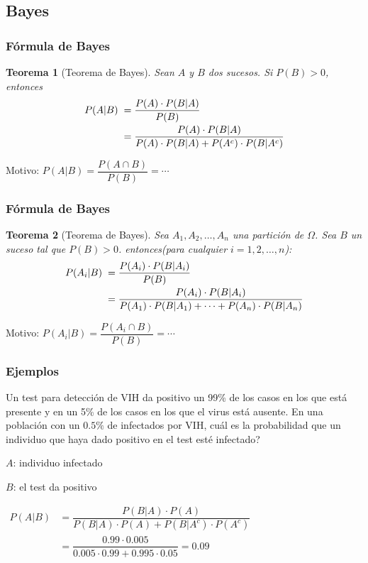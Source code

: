 \documentclass[handout]{beamer}\usepackage[]{graphicx}\usepackage[]{color}
\theoremstyle{plain}
\newtheorem{teorema}{Teorema}
\theoremstyle{definition}
\newcommand{\EM}{\Omega}
\begin{document}
\subsection{Bayes}

\begin{frame}
\frametitle{Fórmula de Bayes}
\begin{teorema}[Teorema de Bayes]
Sean $A$ y $B$ dos sucesos. Si $P(B)>0$, entonces
$$
\begin{array}{rl}
P(A|B) & \hspace*{-1ex} =\dfrac{P(A)\cdot P(B|A)}{P(B)}\\[2ex]
&\hspace*{-1ex} =\dfrac{P(A)\cdot P(B|A)}{P(A)\cdot P(B|A)+P(A^c)\cdot P(B|A^c)}
\end{array}
$$
\end{teorema}
\bigskip

Motivo: $P(A|B) =\dfrac{P(A\cap B)}{P(B)}=\cdots$



\end{frame}

\begin{frame}
\frametitle{Fórmula de Bayes}
\begin{teorema}[Teorema de Bayes]
Sea $A_1,A_2,\ldots,A_n$ una partición de $\EM$. Sea $B$ un suceso tal que $P(B)>0$. entonces(para cualquier $i=1,2,\ldots,n$):
$$
\begin{array}{rl}
P(A_i|B) & \hspace*{-1ex} =\dfrac{P(A_i)\cdot P(B|A_i)}{P(B)}\\[2ex]
&\hspace*{-1ex} =\dfrac{P(A_i)\cdot P(B|A_i)}{P(A_1)\cdot P(B|A_1)+\cdots+P(A_n)\cdot P(B|A_n)}
\end{array}
$$
\end{teorema}
\bigskip

Motivo: $P(A_i|B) =\dfrac{P(A_i\cap B)}{P(B)}=\cdots$

\end{frame}

\begin{frame}
\frametitle{Ejemplos}  

Un test para detección de VIH da positivo un 99\% de los casos en los que  está presente y en un 5\% de los casos  en los que  el virus está ausente. En una población con un  $0.5\%$ de infectados por VIH, cuál es la probabilidad que un individuo que  haya dado positivo en el test esté infectado?

\medskip

$A$: individuo infectado
\medskip

$B$: el test da positivo
\medskip

{\hspace*{-1ex}$\begin{array}{rl}
P(A|B) & =\dfrac{P(B|A)\cdot P(A)}{P(B|A)\cdot P(A)+P(B|A^c)\cdot P(A^c)}\\[2ex]
&=\dfrac{0.99\cdot 0.005}{0.005\cdot 0.99+0.995\cdot 0.05}=0.09\end{array}$}
\end{frame}
\end{document}

